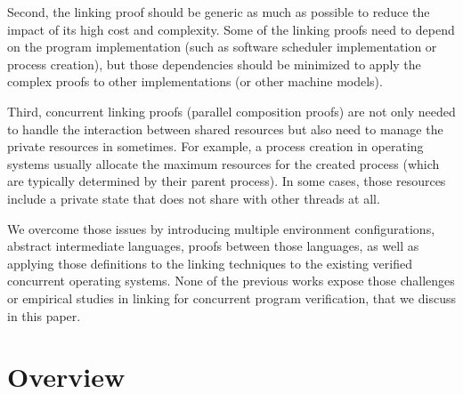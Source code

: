 Second,  
the linking proof should be generic as much as possible to reduce the impact of its high cost and complexity. 
Some of the linking proofs need to depend
on the program implementation (such as software scheduler implementation or process creation), 
but those dependencies should be minimized to apply the complex proofs to other implementations (or other machine models). 

Third, 
concurrent linking proofs (parallel composition proofs) 
are not only needed to handle the interaction between shared resources but also need to manage the private resources in sometimes. 
For example, a process creation in operating systems usually allocate the maximum resources 
for the created process (which are typically determined by their parent process).
In some cases, those resources include a private state that does not share with other threads at all. 



We overcome those issues by introducing multiple environment configurations, abstract intermediate languages,
proofs between those languages,  
as well as applying those definitions to the linking techniques to the existing verified concurrent operating systems. 
None of the previous works expose those challenges or empirical studies in linking for concurrent program verification,
that we discuss in this paper.


\section{Overview}
\label{chapter:conlink:sec:overview}


